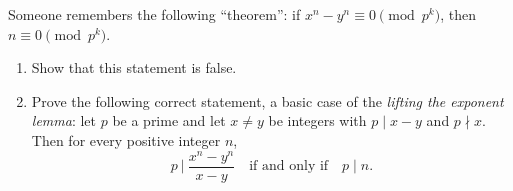 Someone remembers the following ``theorem'': if $x^n-y^n\equiv0\pmod{p^k}$, then $n\equiv0\pmod{p^k}$.
\begin{enumerate}
\item[(a)] Show that this statement is false.
\item[(b)] Prove the following correct statement, a basic case of the \emph{lifting the exponent lemma}: let $p$ be a prime and let $x\ne y$ be integers with $p\mid x-y$ and $p\nmid x$. Then for every positive integer $n$,
\[p\ \Big|\ \dfrac{x^n-y^n}{x-y}\quad\text{if and only if}\quad p\mid n.\]
\end{enumerate}
